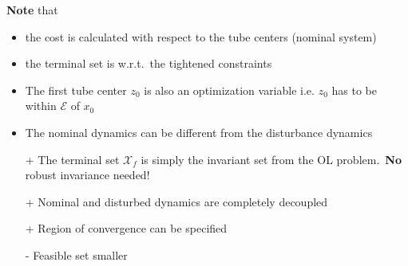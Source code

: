 \textbf{Note} that
\begin{itemize}
    \item the cost is calculated with respect to the tube centers (nominal system)
    \item the terminal set is w.r.t.\ the tightened constraints
    \item The first tube center $z_0$ is also an optimization variable i.e. $z_0$ has to be within $\mathcal{E}$ of $x_0$
    \item The nominal dynamics can be different from the disturbance dynamics
\end{itemize}

\newpar{}

\begin{itemize}
    \item [+] The terminal set $\mathcal{X}_f$ is simply the invariant set from the OL problem.~\textbf{No} robust invariance needed!
    \item [+] Nominal and disturbed dynamics are completely decoupled
    \item [+] Region of convergence can be specified        %
    \item [-] Feasible set smaller  %
\end{itemize}

